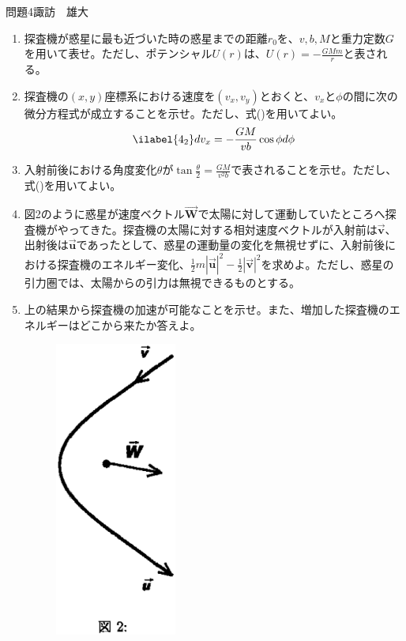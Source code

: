 \documentclass[fleqn]{jbook}
\newcommand{\W}{\vec{\mathbf{W}}} %
\newcommand{\vu}{\vec{\mathbf{u}}} %
\newcommand{\vv}{\vec{\mathbf{v}}} %
\begin{document}
\begin{question}{問題4}{諏訪　雄大}
\begin{enumerate}
\item 探査機が惑星に最も近づいた時の惑星までの距離$r_0$を、$v,b,M$と重力定数$G$を用いて表せ。ただし、ポテンシャル$U(r)は、U(r)=-\frac{GMm}{r}$と表される。
\item 探査機の$(x,y)$座標系における速度を$(v_x,v_y)$とおくと、$v_xと\phi$の間に次の微分方程式が成立することを示せ。ただし、式()を用いてよい。
	\begin{eqnarray}\ilabel{4_2}
	dv_x=-\frac{GM}{vb}\cos\phi d\phi
	\end{eqnarray}
\item 入射前後における角度変化$\theta$が$\tan\frac{\theta}{2}=\frac{GM}{v^2b}$で表されることを示せ。ただし、式()を用いてよい。
	\item 図2のように惑星が速度ベクトル$\W$で太陽に対して運動していたところへ探査機がやってきた。探査機の太陽に対する相対速度ベクトルが入射前は$\vv$、出射後は$\vu$であったとして、惑星の運動量の変化を無視せずに、入射前後における探査機のエネルギー変化、$\frac{1}{2}m|\vu|^2-\frac{1}{2}|\vv|^2$を求めよ。ただし、惑星の引力圏では、太陽からの引力は無視できるものとする。
	\item 上の結果から探査機の加速が可能なことを示せ。また、増加した探査機のエネルギーはどこから来たか答えよ。

      \begin{figure}[htbp]
	  \begin{center}	 
	      \includegraphics[width=40mm]{2003phy4-2.eps}
	  \end{center}
      \end{figure}

\end{enumerate}
\end{question}
\end{document}
